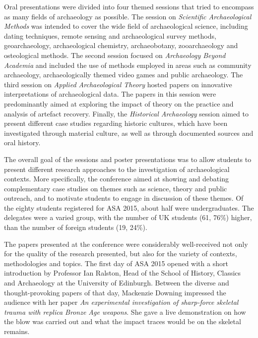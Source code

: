 	Oral presentations were divided into four themed sessions that tried to encompass as many fields of archaeology as possible. The session on \textit{Scientific Archaeological Methods} was intended to cover the wide field of archaeological science, including dating techniques, remote sensing and archaeological survey methods, geoarchaeology, archaeological chemistry, archaeobotany, zooarchaeology and osteological methods. The second session focused on \textit{Archaeology Beyond Academia} and included the use of methods employed in areas such as community archaeology, archaeologically themed video games and public archaeology. The third session on \textit{Applied Archaeological Theory} hosted papers on innovative interpretations of archaeological data. The papers in this session were predominantly aimed at exploring the impact of theory on the practice and analysis of artefact recovery. Finally, the \textit{Historical Archaeology} session aimed to present different case studies regarding historic cultures, which have been investigated through material culture, as well as through documented sources and oral history.
	
	The overall goal of the sessions and poster presentations was to allow students to present different research approaches to the investigation of archaeological contexts. More specifically, the conference aimed at showing and debating complementary case studies on themes such as science, theory and public outreach, and to motivate students to engage in discussion of these themes. Of the eighty students registered for ASA 2015, about half were undergraduates. The delegates were a varied group, with the number of UK students (61, 76\%) higher, than the number of foreign students (19, 24\%).
	
	The papers presented at the conference were considerably well-received not only for the quality of the research presented, but also for the variety of contexts, methodologies and topics. The first day of ASA 2015 opened with a short introduction by Professor Ian Ralston, Head of the School of History, Classics and Archaeology at the University of Edinburgh. Between the diverse and thought-provoking papers of that day, Mackenzie Downing impressed the audience with her paper \textit{An experimental investigation of sharp-force skeletal trauma with replica Bronze Age weapons}. She gave a live demonstration on how the blow was carried out and what the impact traces would be on the skeletal remains.
	
